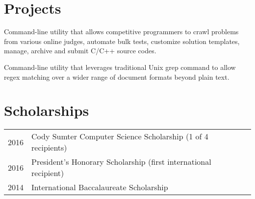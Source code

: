 \documentclass[letterpaper]{deedy-resume} %
\begin{document}
\begin{minipage}[t]{0.66\textwidth}
\section{Projects}

Command-line utility that allows competitive programmers to crawl problems from various online judges, automate bulk tests, customize solution templates, manage, archive and submit C/C++ source codes.

\sectionspace %

Command-line utility that leverages traditional Unix grep command to allow regex matching over a wider range of document formats beyond plain text.

\sectionspace  %


\section{Scholarships} 

\begin{tabular}{rll}
2016 & Cody Sumter Computer Science Scholarship (1 of 4 recipients)\\
2016 & President's Honorary Scholarship (first international recipient)\\
2014 & International Baccalaureate Scholarship
\end{tabular}

\sectionspace %


\end{minipage} %



\end{document}
